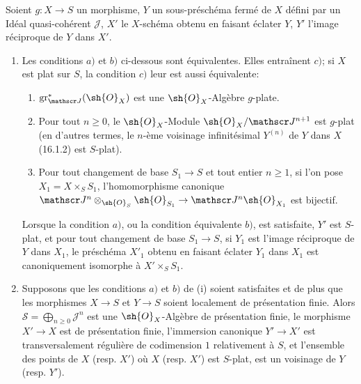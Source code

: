 \begin{proposition}[19.4.6]
\label{IV.19.4.6}
Soient $g:X\to S$ un morphisme, $Y$ un sous-préschéma fermé de $X$ défini par un Idéal quasi-cohérent $\mathscr J$, $X'$ le $X$-schéma obtenu en faisant éclater $Y$, $Y'$ l'image réciproque de $Y$ dans $X'$.
\begin{enumerate}
  \item[(i)] Les conditions $a)$ et $b)$ ci-dessous sont équivalentes. Elles entraînent $c)$; si $X$ est plat sur $S$, la condition $c)$ leur est aussi équivalente:
  \begin{enumerate}
    \item[a)] $\operatorname{gr}_{\mathscr J}^*(\sh{O}_X)$ est une $\sh{O}_X$-Algèbre $g$-plate.
    \item[b)] Pour tout $n\geq0$, le $\sh{O}_X$-Module $\sh{O}_X/\mathscr J^{n+1}$ est $g$-plat (en d'autres termes, le $n$-ème voisinage infinitésimal $Y^{(n)}$ de $Y$ dans $X$ (16.1.2) est $S$-plat).
    \item[c)] Pour tout changement de base $S_1\to S$ et tout entier $n\geq1$, si l'on pose $X_1=X\times_S S_1$, l'homomorphisme canonique $\mathscr J^n\otimes_{\sh{O}_S}\sh{O}_{S_1}\to\mathscr J^n\sh{O}_{X_1}$ est bijectif.
  \end{enumerate}
  Lorsque la condition $a)$, ou la condition équivalente $b)$, est satisfaite, $Y'$ est $S$-plat, et pour tout changement de base $S_1\to S$, si $Y_1$ est l'image réciproque de $Y$ dans $X_1$, le préschéma $X'_1$ obtenu en faisant éclater $Y_1$ dans $X_1$ est canoniquement isomorphe à $X'\times_S S_1$.
  \item[(ii)] Supposons que les conditions $a)$ et $b)$ de (i) soient satisfaites et de plus que les morphismes $X\to S$ et $Y\to S$ soient localement de présentation finie. Alors $\mathscr S=\bigoplus_{n\geq0}\mathscr J^n$ est une $\sh{O}_X$-Algèbre de présentation finie, le morphisme $X'\to X$ est de présentation finie, l'immersion canonique $Y'\to X'$ est transversalement régulière de codimension $1$ relativement à $S$, et l'ensemble des points de $X$ (resp. $X'$) où $X$ (resp. $X'$) est $S$-plat, est un voisinage de $Y$ (resp. $Y'$).
\end{enumerate}
\end{proposition}

